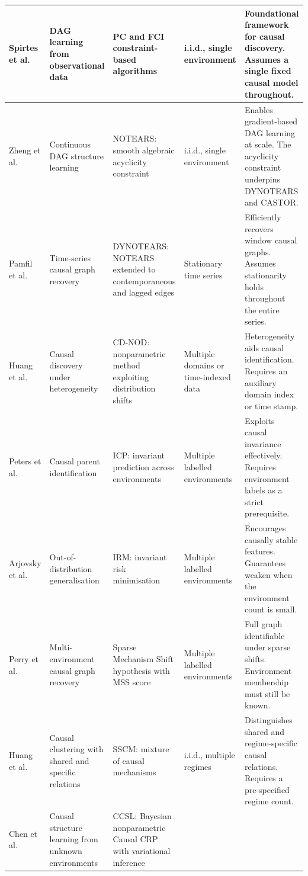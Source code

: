 {\begin{longtable}{|P{2.0cm}|P{2.3cm}|P{2.5cm}|P{1.8cm}|P{4.3cm}|}
Spirtes et al.\ \cite{spirtes2000causation}
& DAG learning from observational data
& PC and FCI constraint-based algorithms
& i.i.d., single environment
& Foundational framework for causal discovery. Assumes a single fixed causal model throughout. \\
\hline
Zheng et al.\ \cite{zheng2018dags}
& Continuous DAG structure learning
& NOTEARS: smooth algebraic acyclicity constraint
& i.i.d., single environment
& Enables gradient-based DAG learning at scale. The acyclicity constraint underpins DYNOTEARS and CASTOR. \\
\hline
Pamfil et al.\ \cite{pamfil2020dynotears}
& Time-series causal graph recovery
& DYNOTEARS: NOTEARS extended to contemporaneous and lagged edges
& Stationary time series
& Efficiently recovers window causal graphs. Assumes stationarity holds throughout the entire series. \\
\hline
Huang et al.\ \cite{huang2020causal}
& Causal discovery under heterogeneity
& CD-NOD: nonparametric method exploiting distribution shifts
& Multiple domains or time-indexed data
& Heterogeneity aids causal identification. Requires an auxiliary domain index or time stamp. \\
\hline
Peters et al.\ \cite{peters2016causal}
& Causal parent identification
& ICP: invariant prediction across environments
& Multiple labelled environments
& Exploits causal invariance effectively. Requires environment labels as a strict prerequisite. \\
\hline
Arjovsky et al.\ \cite{arjovsky2019irm}
& Out-of-distribution generalisation
& IRM: invariant risk minimisation
& Multiple labelled environments
& Encourages causally stable features. Guarantees weaken when the environment count is small. \\
\hline
Perry et al.\ \cite{perry2022causal}
& Multi-environment causal graph recovery
& Sparse Mechanism Shift hypothesis with MSS score
& Multiple labelled environments
& Full graph identifiable under sparse shifts. Environment membership must still be known. \\
\hline
Huang et al.\ \cite{huang2019specific}
& Causal clustering with shared and specific relations
& SSCM: mixture of causal mechanisms
& i.i.d., multiple regimes
& Distinguishes shared and regime-specific causal relations. Requires a pre-specified regime count. \\
\hline
Chen et al.\ \cite{chen2023ccsl}
& Causal structure learning from unknown environments
& CCSL: Bayesian nonparametric Causal CRP with variational inference

\end{longtable}}
